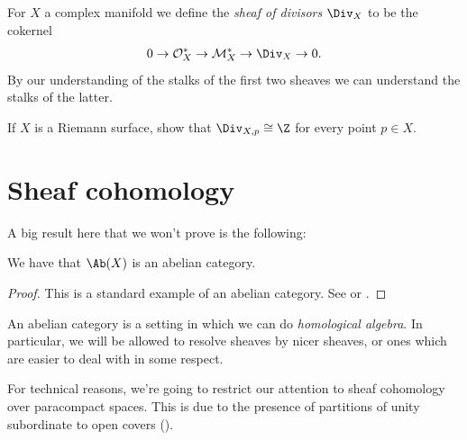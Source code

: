 \documentclass[11pt]{amsart}
\begin{document}
\begin{example} For $X$ a complex manifold we define the \emph{sheaf of divisors} $\Div_X$ to be the cokernel
\begin{align*}
    0 \to \mathcal{O}_X^\ast \to \mathcal{M}_X^\ast \to \Div_X \to 0.
\end{align*}
By our understanding of the stalks of the first two sheaves we can understand the stalks of the latter.
\end{example}

\begin{exercise} If $X$ is a Riemann surface, show that $\Div_{X,p} \cong \Z$ for every point $p\in X$.
\end{exercise}

\section{Sheaf cohomology}
A big result here that we won't prove is the following:

\begin{theorem} We have that $\Ab(X)$ is an abelian category.
\end{theorem}
\begin{proof} This is a standard example of an abelian category. See \cite[II\S2]{godementTopologieAlgebriqueTheorie1958} or \cite{Tohoku}.
\end{proof}

An abelian category is a setting in which we can do \emph{homological algebra}. In particular, we will be allowed to resolve sheaves by nicer sheaves, or ones which are easier to deal with in some respect.

\begin{remark} For technical reasons, we're going to restrict our attention to sheaf cohomology over paracompact spaces. This is due to the presence of partitions of unity subordinate to open covers ().
\end{remark}
\end{document}
